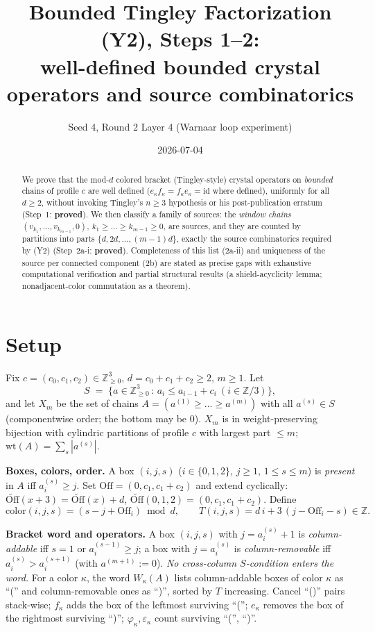 \documentclass[11pt]{article}
\title{Bounded Tingley Factorization (Y2), Steps 1--2:\\
well-defined bounded crystal operators and source combinatorics}
\author{Seed 4, Round 2 Layer 4 (Warnaar loop experiment)}
\date{2026-07-04}
\theoremstyle{definition}
\newcommand{\Off}{\mathrm{Off}}
\newcommand{\Offe}{\widetilde{\Off}}
\newcommand{\eps}{\varepsilon}
\begin{document}
\maketitle

\begin{abstract}
We prove that the mod-$d$ colored bracket (Tingley-style) crystal operators on
\emph{bounded} chains of profile $c$ are well defined ($e_\kappa f_\kappa =
f_\kappa e_\kappa = \mathrm{id}$ where defined), uniformly for all $d\ge 2$,
without invoking Tingley's $n\ge 3$ hypothesis or his post-publication erratum
(Step~1: \textbf{proved}). We then classify a family of sources: the
\emph{window chains} $(v_{k_1},\dots,v_{k_{m-1}},0)$, $k_1\ge\dots\ge
k_{m-1}\ge 0$, are sources, and they are counted by partitions into parts
$\{d,2d,\dots,(m-1)d\}$, exactly the source combinatorics required by (Y2)
(Step~2a-i: \textbf{proved}). Completeness of this list (2a-ii) and uniqueness
of the source per connected component (2b) are stated as precise gaps with
exhaustive computational verification and partial structural results
(a shield-acyclicity lemma; nonadjacent-color commutation as a theorem).
\end{abstract}

\section{Setup}

Fix $c=(c_0,c_1,c_2)\in\mathbb{Z}_{\ge0}^3$, $d=c_0+c_1+c_2\ge 2$, $m\ge 1$.
Let
\[
S \;=\; \{a\in\mathbb{Z}_{\ge0}^3 \,:\, a_i \le a_{i-1}+c_i \ (i\in\mathbb{Z}/3)\},
\]
and let $X_m$ be the set of chains $A=(a^{(1)}\ge\dots\ge a^{(m)})$ with all
$a^{(s)}\in S$ (componentwise order; the bottom may be $0$). $X_m$ is in
weight-preserving bijection with cylindric partitions of profile $c$ with
largest part $\le m$; $\mathrm{wt}(A)=\sum_s |a^{(s)}|$.

\textbf{Boxes, colors, order.} A box $(i,j,s)$ ($i\in\{0,1,2\}$, $j\ge1$,
$1\le s\le m$) is \emph{present} in $A$ iff $a^{(s)}_i\ge j$. Set
$\Off=(0,c_1,c_1+c_2)$ and extend cyclically:
$\Offe(x+3)=\Offe(x)+d$, $\Offe(0,1,2)=(0,c_1,c_1+c_2)$. Define
\[
\mathrm{color}(i,j,s) = (s-j+\Off_i)\bmod d,
\qquad
T(i,j,s) = d\,i + 3\,(j-\Off_i-s)\in\mathbb{Z}.
\]

\textbf{Bracket word and operators.} A box $(i,j,s)$ with $j=a^{(s)}_i+1$ is
\emph{column-addable} iff $s=1$ or $a^{(s-1)}_i\ge j$; a box with $j=a^{(s)}_i$
is \emph{column-removable} iff $a^{(s)}_i > a^{(s+1)}_i$ (with
$a^{(m+1)}:=0$). \emph{No cross-column $S$-condition enters the word.} For a
color $\kappa$, the word $W_\kappa(A)$ lists column-addable boxes of color
$\kappa$ as ``('' and column-removable ones as ``)'', sorted by $T$
increasing. Cancel ``()'' pairs stack-wise; $f_\kappa$ adds the box of the
leftmost surviving ``(''; $e_\kappa$ removes the box of the rightmost
surviving ``)''; $\varphi_\kappa,\eps_\kappa$ count surviving ``('', ``)''.
\end{document}
